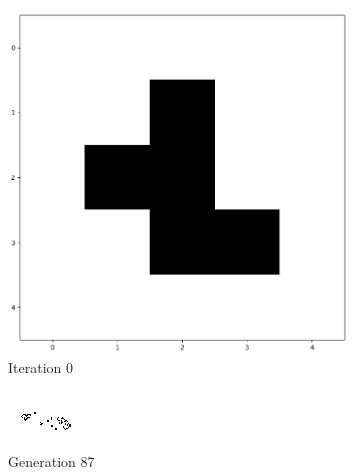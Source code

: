\documentclass[../main.tex]{subfiles}
\begin{document}
\begin{figure}[H]
    \centering
    \begin{subfigure}{0.2\textwidth}
        \centering
        \includegraphics[width=\textwidth]{IMAGES/part5/StartConfigCGOF.png}
        \caption{Iteration 0}
		\label{fig:startconfigcgof}
    \end{subfigure}
    \hfill
    \begin{subfigure}{0.35\textwidth}
        \centering
        \includegraphics[width=\textwidth]{IMAGES/part5/CGOF_1.png}
        \caption{Generation 87}
    \end{subfigure}
    \hfill
    \begin{subfigure}{0.35\textwidth}

\end{subfigure}
\end{figure}
\end{document}
